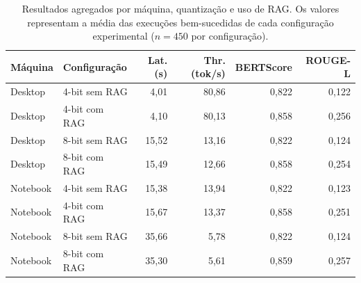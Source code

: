 \begin{table}[ht]
\centering
\small
\caption{Resultados agregados por máquina, quantização e uso de RAG. Os valores representam a média das execuções bem-sucedidas de cada configuração experimental ($n=450$ por configuração).}
\label{tab:results-ci95}
\begin{tabular}{llrrrr}
\toprule
Máquina & Configuração & Lat. (s) & Thr. (tok/s) & BERTScore & ROUGE-L \\
\midrule
Desktop & 4-bit sem RAG & 4,01 & 80,86 & 0,822 & 0,122 \\
Desktop & 4-bit com RAG & 4,10 & 80,13 & 0,858 & 0,256 \\
Desktop & 8-bit sem RAG & 15,52 & 13,16 & 0,822 & 0,124 \\
Desktop & 8-bit com RAG & 15,49 & 12,66 & 0,858 & 0,254 \\
Notebook & 4-bit sem RAG & 15,38 & 13,94 & 0,822 & 0,123 \\
Notebook & 4-bit com RAG & 15,67 & 13,37 & 0,858 & 0,251 \\
Notebook & 8-bit sem RAG & 35,66 & 5,78 & 0,822 & 0,124 \\
Notebook & 8-bit com RAG & 35,30 & 5,61 & 0,859 & 0,257 \\
\bottomrule
\end{tabular}
\end{table}
